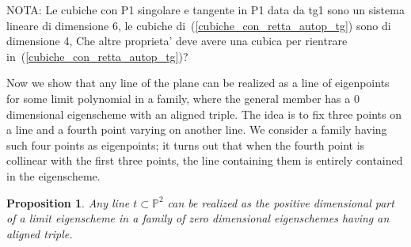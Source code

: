 \documentclass{amsart}
\theoremstyle{plain}
\newtheorem{prop}[lemma]{Proposition}
\theoremstyle{definition}
\newcommand{\p}{\mathbb{P}}
\begin{document}
NOTA: Le cubiche con P1 singolare e tangente in P1 data da tg1 sono
un sistema lineare di dimensione 6, le cubiche
di~(\ref{cubiche_con_retta_autop_tg}) sono di dimensione
4, Che altre proprieta' deve avere una cubica per rientrare
in~(\ref{cubiche_con_retta_autop_tg})?

\medskip
Now we show that any line of the plane can be realized as a line of eigenpoints for some limit polynomial in a family, where the general member has a $0$ dimensional eigenscheme with an aligned triple. The idea is to fix three points on a line and a fourth point varying on another line. We consider a family having such four points as eigenpoints; it turns out that when the fourth point is collinear with the first three points, the line containing them is entirely contained in the eigenscheme.

\begin{prop}
\label{prop:line_as_limit}
    Any line $t \subset \p^2$ can be realized as the positive dimensional part of a limit eigenscheme in a family of zero dimensional eigenschemes having an aligned triple.
\end{prop}
\end{document}
